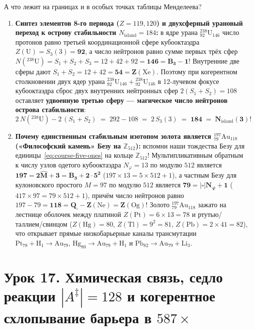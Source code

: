 А что лежит на границах и в особых точках таблицы Менделеева?
\begin{enumerate}[label=\textbf{\arabic*.},leftmargin=*]
\item \textbf{Синтез элементов 8-го периода ($Z=119, 120$) и двухсферный урановый переход к острову стабильности $N_{\mathrm{island}} = 184$:}
  в ядре урана $^{238}_{92}\mathrm{U}_{146}$ число протонов равно третьей координационной сфере кубооктаэдра $Z(\mathrm{U}) = S_3(3) = \mathbf{92}$, а число нейтронов равно сумме первых трёх сфер $N(^{238}\mathrm{U}) = S_1 + S_2 + S_3 = 12 + 42 + 92 = \mathbf{146 = B_3 - 1}$! Внутренние две сферы дают $S_1 + S_2 = 12 + 42 = \mathbf{54 = Z(\mathrm{Xe})}$. Поэтому при когерентном столкновении двух ядер урана $^{238}_{92}\mathrm{U}_{146} + {}^{238}_{92}\mathrm{U}_{146}$ в 12-лучевом фокусе кубооктаэдра сброс двух внутренних нейтронных сфер $2(S_1+S_2) = 108$ оставляет \textbf{удвоенную третью сферу --- магическое число нейтронов острова стабильности}:
  \[
    2\,N(^{238}\mathrm{U}) - 2\,(S_1 + S_2) \;=\; 292 - 108 \;=\; 2\,S_3(3) \;=\; \mathbf{184 \;=\; N_{\mathrm{island}}(3)}!
  \]
\item \textbf{Почему единственным стабильным изотопом золота является $^{197}_{79}\mathrm{Au}_{118}$ («Философский камень» Безу на $\mathbb{Z}_{512}$):}
  вспомни наши тождества Безу для единицы~\eqref{eq:course-five-ones} на кольце $\mathbb{Z}_{512}$! Мультипликативным обратным к числу узлов одетого кубооктаэдра $N_\varphi = 13$ по модулю $512$ является $\mathbf{197 = 2\hat{M} + 3 = B_3 + 2\cdot 5^2}$ ($197\times 13 = 5\times 512 + 1$), а частным Безу для кулоновского простого $\hat{M} = 97$ по модулю $512$ является $\mathbf{79 = |\square|N_\varphi + 1}$ ($417\times 97 = 79\times 512 + 1$), причём число нейтронов равно $197 - 79 = \mathbf{118 = Q_\square - Z(\mathrm{Ne}) = Z(\mathrm{Og})}$! Золото $^{197}_{79}\mathrm{Au}_{118}$ зажато на лестнице оболочек между платиной $Z(\mathrm{Pt}) = 6\times 13 = 78$ и ртутью/таллием/свинцом ($Z(\mathrm{Hg}) = 80$, $Z(\mathrm{Tl}) = 9^2 = 81$, $Z(\mathrm{Pb}) = 2\times 41 = 82$), что открывает прямые низкобарьерные каналы трансмутации $\mathrm{Pt}_{78} + \mathrm{H}_1 \to \mathrm{Au}_{79}$, $\mathrm{Hg}_{80} \to \mathrm{Au}_{79} + \mathrm{H}_1$ и $\mathrm{Pb}_{82} \to \mathrm{Au}_{79} + \mathrm{Li}_3$.
\end{enumerate}

\section{Урок 17. Химическая связь, седло реакции \texorpdfstring{$|A^\ddagger| = 128$}{|A| = 128} и когерентное схлопывание барьера в \texorpdfstring{$587\times$}{587x}}

